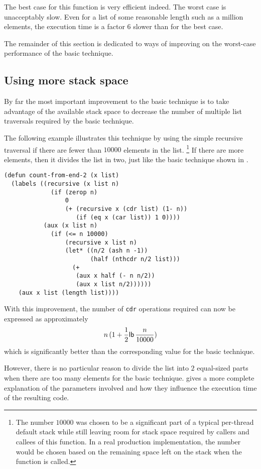 The best case for this function is very efficient indeed.
The worst case is unacceptably slow.  Even for a list of some
reasonable length such as a million elements, the execution time is a
factor $6$ slower than for the best case.

The remainder of this section is dedicated to ways of improving on the
worst-case performance of the basic technique.

\subsection{Using more stack space}
\label{sec-more-stack}

By far the most important improvement to the basic technique is to
take advantage of the available stack space to decrease the number of
multiple list traversals required by the basic technique.

The following example illustrates this technique by using the simple
recursive traversal if there are fewer than $10000$ elements in the
list.%
\footnote{The number $10000$ was chosen to be a significant part of a
  typical per-thread default stack while still leaving room for stack
  space required by callers and callees of this function.  In a real
  production implementation, the number would be chosen based on the
  remaining space left on the stack when the function is called.}
If there are more elements, then it divides the list in two,
just like the basic technique shown in .

{\small
\begin{verbatim}
(defun count-from-end-2 (x list)
  (labels ((recursive (x list n)
             (if (zerop n)
                 0
                 (+ (recursive x (cdr list) (1- n))
                    (if (eq x (car list)) 1 0))))
           (aux (x list n)
             (if (<= n 10000)
                 (recursive x list n)
                 (let* ((n/2 (ash n -1))
                        (half (nthcdr n/2 list)))
                   (+
                    (aux x half (- n n/2))
                    (aux x list n/2))))))
    (aux x list (length list))))
\end{verbatim}
}

With this improvement, the number of \texttt{cdr} operations required
can now be expressed as ap\-proximately 
\[
n\thinspace (1 +
\frac{1}{2}\mathsf{lb}\thinspace \frac{n}{10000})
\]
which is significantly better than the corresponding value for the
basic technique.

However, there is no particular reason to divide the list into $2$
equal-sized parts when there are too many elements for the basic
technique.  gives a more complete explanation
of the parameters involved and how they influence the execution time
of the resulting code.


